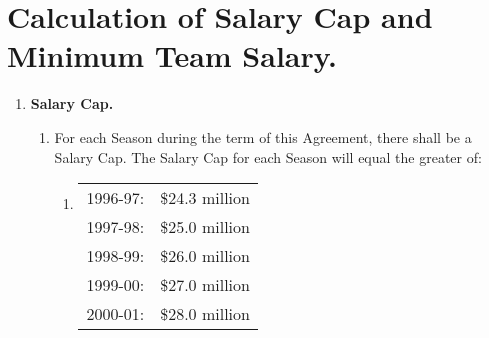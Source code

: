 \documentclass[
]{book}
\providecommand{\tightlist}{%
  \setlength{\itemsep}{0pt}\setlength{\parskip}{0pt}}
\begin{document}
\hypertarget{calculation-of-salary-cap-and-minimum-team-salary.}{%
\section{Calculation of Salary Cap and Minimum Team Salary.}\label{calculation-of-salary-cap-and-minimum-team-salary.}}

\begin{enumerate}
\def\labelenumi{(\alph{enumi})}
\tightlist
\item
  \textbf{Salary Cap.}

  \begin{enumerate}
  \def\labelenumii{(\arabic{enumii})}
  \tightlist
  \item
    For each Season during the term of this Agreement, there shall be a Salary Cap. The Salary Cap for each Season will equal the greater of:

    \begin{enumerate}
    \def\labelenumiii{(\roman{enumiii})}
    \item
      \begin{longtable}[]{@{}cc@{}}
      \toprule()
      \endhead
      1996-97: & \$24.3 million \\
      1997-98: & \$25.0 million \\
      1998-99: & \$26.0 million \\
      1999-00: & \$27.0 million \\
      2000-01: & \$28.0 million \\
      \bottomrule()
      \end{longtable}


\end{enumerate}
\end{enumerate}
\end{enumerate}
\end{document}

